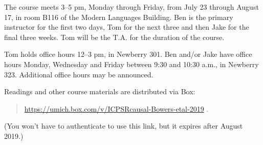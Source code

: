 The course meets 3--5 pm, Monday through Friday, from July 23 through
August 17, in room B116 of the Modern Languages Building.  
Ben is the primary instructor for the first two days, Tom for the next three and then Jake for the final three weeks. Tom will be the T.A. for the duration of the course.

Tom holds office hours 12--3 pm, in Newberry 301. Ben and/or Jake
have office hours Monday, Wednesday and Friday between 9:30 and 10:30
a.m., in Newberry 323. Additional office hours may be announced.

Readings and other course materials are distributed via Box:
\begin{quote}
\url{https://umich.box.com/v/ICPSRcausal-Bowers-etal-2019} .
\end{quote}
(You won't have to authenticate to use this link, but it expires after 
August 2019.)
